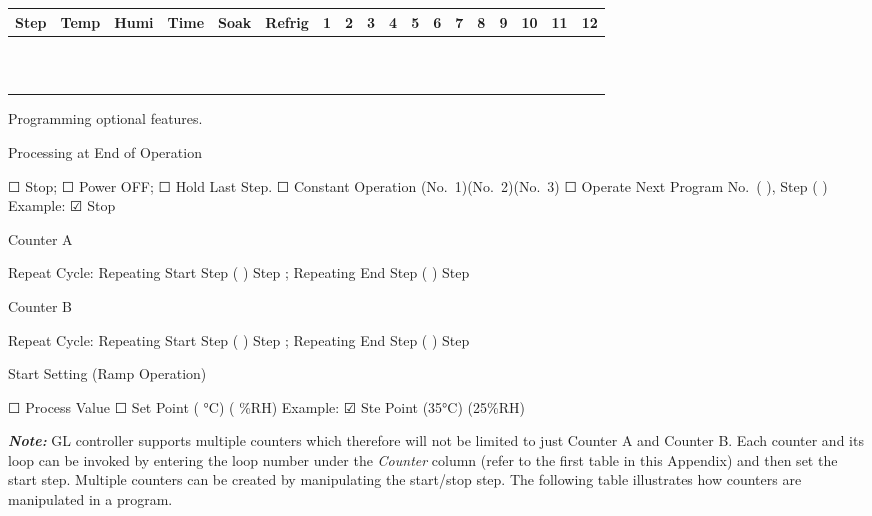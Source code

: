 \begin{longtable}[]{@{}llllllllllllllllll@{}}
\toprule
Step & Temp & Humi & Time & Soak & Refrig & 1 & 2 & 3 & 4 & 5 & 6 & 7 &
8 & 9 & 10 & 11 & 12\tabularnewline
\midrule
\endhead
& & & & & & & & & & & & & & & & &\tabularnewline
& & & & & & & & & & & & & & & & &\tabularnewline
& & & & & & & & & & & & & & & & &\tabularnewline
& & & & & & & & & & & & & & & & &\tabularnewline
& & & & & & & & & & & & & & & & &\tabularnewline
& & & & & & & & & & & & & & & & &\tabularnewline
& & & & & & & & & & & & & & & & &\tabularnewline
& & & & & & & & & & & & & & & & &\tabularnewline
& & & & & & & & & & & & & & & & &\tabularnewline
& & & & & & & & & & & & & & & & &\tabularnewline
& & & & & & & & & & & & & & & & &\tabularnewline
\bottomrule
\end{longtable}

Programming optional features.

Processing at End of Operation

☐ Stop; ☐ Power OFF; ☐ Hold Last Step. ☐ Constant Operation
(No.~1)(No.~2)(No.~3) ☐ Operate Next Program No.~( ), Step ( ) Example:
☑ Stop

Counter A

Repeat Cycle: Repeating Start Step ( ) Step ; Repeating End Step ( )
Step

Counter B

Repeat Cycle: Repeating Start Step ( ) Step ; Repeating End Step ( )
Step

Start Setting (Ramp Operation)

☐ Process Value ☐ Set Point ( °C) ( \%RH) Example: ☑ Ste Point (35°C)
(25\%RH)

\textbf{\emph{Note:}} GL controller supports multiple counters which
therefore will not be limited to just Counter A and Counter B. Each
counter and its loop can be invoked by entering the loop number under
the \emph{Counter} column (refer to the first table in this Appendix)
and then set the start step. Multiple counters can be created by
manipulating the start/stop step. The following table illustrates how
counters are manipulated in a program.

